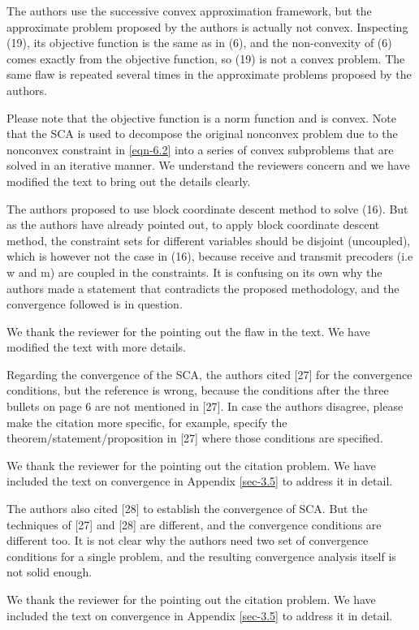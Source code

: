  The authors use the successive convex approximation framework, but the approximate problem proposed by the authors is actually not convex. Inspecting (19), its objective function is the same as in (6), and the non-convexity of (6) comes exactly from the objective function, so (19) is not a convex problem. The same flaw is repeated several times in the approximate problems proposed by the authors.

\resp Please note that the objective function is a norm function and is convex. Note that the \ac{SCA} is used to decompose the original nonconvex problem due to the nonconvex constraint in \eqref{eqn-6.2} into a series of convex subproblems that are solved in an iterative manner. We understand the reviewers concern and we have modified the text to bring out the details clearly.

 The authors proposed to use block coordinate descent method to solve (16). But as the authors have already pointed out, to apply block coordinate descent method, the constraint sets for different variables should be disjoint (uncoupled), which is however not the case in (16), because receive and transmit precoders (i.e w and m) are coupled in the constraints. It is confusing on its own why the authors made a statement that contradicts the proposed methodology, and the convergence followed is in question.

\resp We thank the reviewer for the pointing out the flaw in the text. We have modified the text with more details.

 Regarding the convergence of the SCA, the authors cited [27] for the convergence conditions, but the reference is wrong, because the conditions after the three bullets on page 6 are not mentioned in [27]. In case the authors disagree, please make the citation more specific, for example, specify the theorem/statement/proposition in [27] where those conditions are specified.

\resp We thank the reviewer for the pointing out the citation problem. We have included the text on convergence in Appendix \ref{sec-3.5} to address it in detail.

 The authors also cited [28] to establish the convergence of SCA. But the techniques of [27] and [28] are different, and the convergence conditions are different too. It is not clear why the authors need two set of convergence conditions for a single problem, and the resulting convergence analysis itself is not solid enough.

\resp We thank the reviewer for the pointing out the citation problem. We have included the text on convergence in Appendix \ref{sec-3.5} to address it in detail.

